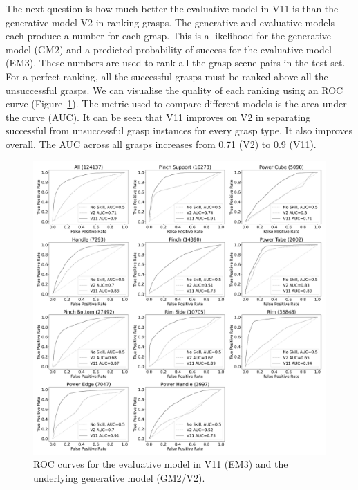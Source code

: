 The next question is how much better the evaluative model in V11 is than the generative model V2 in ranking grasps. The generative and evaluative models each produce a number for each grasp. This is a likelihood for the generative model (GM2) and a predicted probability of success for the evaluative model (EM3). These numbers are used to rank all the grasp-scene pairs in the test set. For a perfect ranking, all the successful grasps must be ranked above all the unsuccessful grasps. We can visualise the quality of each ranking using an ROC curve (Figure~\ref{fig:roc}). The metric used to compare different models is the area under the curve (AUC). It can be seen that V11 improves on V2 in separating successful from unsuccessful grasp instances for every grasp type. It also improves overall. The AUC across all grasps increases from 0.71 (V2) to 0.9 (V11). 

\begin{figure}[h]
\centering
\includegraphics[width=0.9\columnwidth]{images/post-analysis/V11_vs_v2_ROC_across_all_scenes}
\caption{\label{fig:roc}ROC curves for the evaluative model in V11 (EM3) and the underlying generative model (GM2/V2).}
\end{figure}

